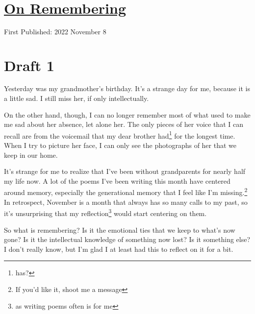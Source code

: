 \documentclass[12pt]{article}[titlepage]
\newcommand{\1}{\={a}}
\newcommand{\2}{\={e}}
\newcommand{\3}{\={\i}}
\newcommand{\4}{\=o}
\newcommand{\5}{\=u}
\newcommand{\6}{\={A}}
\renewcommand{\,}{\textsuperscript{,}}
\begin{document}

\doublespacing
\section{\href{remembering.html}{On Remembering}}
First Published: 2022 November 8
\section{Draft 1}
Yesterday was my grandmother's birthday.
It's a strange day for me, because it is a little sad.
I still miss her, if only intellectually.

On the other hand, though, I can no longer remember most of what used to make me sad about her absence, let alone her.
The only pieces of her voice that I can recall are from the voicemail that my dear brother had\footnote{has?} for the longest time.
When I try to picture her face, I can only see the photographs of her that we keep in our home.

It's strange for me to realize that I've been without grandparents for nearly half my life now.
A lot of the poems I've been writing this month have centered around memory, especially the generational memory that I feel like I'm missing.\footnote{If you'd like it, shoot me a message}
In retrospect, November is a month that always has so many calls to my past, so it's unsurprising that my reflection\footnote{as writing poems often is for me} would start centering on them.

So what is remembering?
Is it the emotional ties that we keep to what's now gone?
Is it the intellectual knowledge of something now lost?
Is it something else?
I don't really know, but I'm glad I at least had this to reflect on it for a bit.
\end{document}
